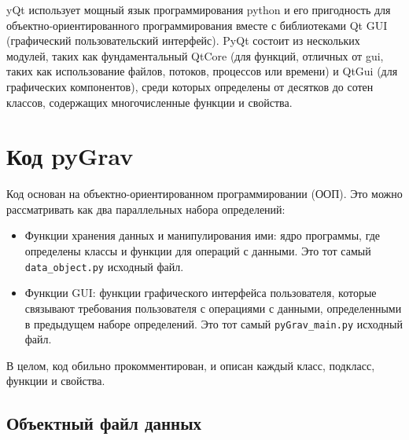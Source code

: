 yQt использует мощный язык программирования python и его пригодность для
объектно-ориентированного программирования вместе с библиотеками Qt GUI
(графический пользовательский интерфейс). PyQt состоит из нескольких модулей,
таких как фундаментальный QtCore (для функций, отличных от gui, таких как
использование файлов, потоков, процессов или времени) и QtGui (для графических
компонентов), среди которых определены от десятков до сотен классов, содержащих
многочисленные функции и свойства.

\section[Код pyGrav]{Код pyGrav}
\label{sec:pygrav_code}

Код основан на объектно-ориентированном программировании (ООП). Это можно
рассматривать как два параллельных набора определений:
\begin{itemize}
    \item Функции хранения данных и манипулирования ими: ядро программы, где
    определены классы и функции для операций с данными. Это тот самый
    \verb|data_object.py| исходный файл.

    \item Функции GUI: функции графического интерфейса пользователя, которые
    связывают требования пользователя с операциями с данными, определенными в
    предыдущем наборе определений. Это тот самый \verb|pyGrav_main.py| исходный
    файл.
    
\end{itemize}

В целом, код обильно прокомментирован, и описан каждый класс, подкласс, функции и свойства.

\subsection[Объектный файл данных]{Объектный файл данных}
\label{subsec:data_object_file}

